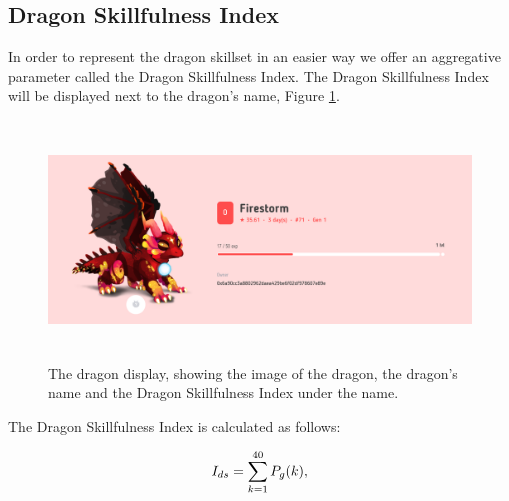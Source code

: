\documentclass[12pt]{article}
\begin{document}
{\subsection{Dragon Skillfulness Index}
\label{Dragon Skillfulness Index}  \par

In order to represent the dragon skillset in an easier way we offer an aggregative parameter called the Dragon Skillfulness Index. The Dragon Skillfulness Index will be displayed next to the dragon’s name, Figure \ref{fig:The_dragon_display_showing_the_image_of_the_dragon_the_dragons_name_and_the_Dragon_Skillfulness_Index_on_the_left_of_the_name}.\par




\begin{figure}[!ht]
	\begin{FlushLeft}		\includegraphics[width=6.27in,height=2.49in]{./media/image21.png}
		\caption{The dragon display, showing the image of the dragon, the dragon's name and the Dragon Skillfulness Index under the name.}
		\label{fig:The_dragon_display_showing_the_image_of_the_dragon_the_dragons_name_and_the_Dragon_Skillfulness_Index_on_the_left_of_the_name}
	\end{FlushLeft}\end{figure}




\par

The Dragon Skillfulness Index is calculated as follows:\par

\setlength{\parskip}{0.0pt}
\begin{center}
  \begin{equation} \label{Eq:I_{ds}}
      I_{ds}=\sum_{k=1}^{40} P_g(k),
  \end{equation}
\end{center} \par

}
\end{document}
